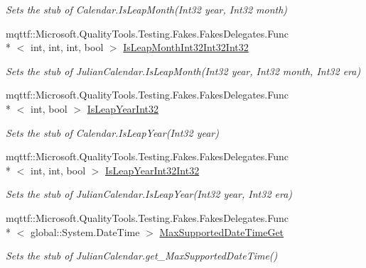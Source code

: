\begin{DoxyCompactItemize}
\begin{DoxyCompactList}\small\item\em Sets the stub of Calendar.\-Is\-Leap\-Month(\-Int32 year, Int32 month)\end{DoxyCompactList}\item 
mqttf\-::\-Microsoft.\-Quality\-Tools.\-Testing.\-Fakes.\-Fakes\-Delegates.\-Func\\*
$<$ int, int, int, bool $>$ \hyperlink{class_system_1_1_globalization_1_1_fakes_1_1_stub_julian_calendar_a53b5cff1d67f7c67dfa61dc92933f5c5}{Is\-Leap\-Month\-Int32\-Int32\-Int32}
\begin{DoxyCompactList}\small\item\em Sets the stub of Julian\-Calendar.\-Is\-Leap\-Month(\-Int32 year, Int32 month, Int32 era)\end{DoxyCompactList}\item 
mqttf\-::\-Microsoft.\-Quality\-Tools.\-Testing.\-Fakes.\-Fakes\-Delegates.\-Func\\*
$<$ int, bool $>$ \hyperlink{class_system_1_1_globalization_1_1_fakes_1_1_stub_julian_calendar_aa4a7c03d11867f3ac87b22980c0629db}{Is\-Leap\-Year\-Int32}
\begin{DoxyCompactList}\small\item\em Sets the stub of Calendar.\-Is\-Leap\-Year(\-Int32 year)\end{DoxyCompactList}\item 
mqttf\-::\-Microsoft.\-Quality\-Tools.\-Testing.\-Fakes.\-Fakes\-Delegates.\-Func\\*
$<$ int, int, bool $>$ \hyperlink{class_system_1_1_globalization_1_1_fakes_1_1_stub_julian_calendar_af8ee7fb759f2f8878aaeac3692b96f6e}{Is\-Leap\-Year\-Int32\-Int32}
\begin{DoxyCompactList}\small\item\em Sets the stub of Julian\-Calendar.\-Is\-Leap\-Year(\-Int32 year, Int32 era)\end{DoxyCompactList}\item 
mqttf\-::\-Microsoft.\-Quality\-Tools.\-Testing.\-Fakes.\-Fakes\-Delegates.\-Func\\*
$<$ global\-::\-System.\-Date\-Time $>$ \hyperlink{class_system_1_1_globalization_1_1_fakes_1_1_stub_julian_calendar_a2d5a8b651cc3ff7db26f630b58bb35b9}{Max\-Supported\-Date\-Time\-Get}
\begin{DoxyCompactList}\small\item\em Sets the stub of Julian\-Calendar.\-get\-\_\-\-Max\-Supported\-Date\-Time()\end{DoxyCompactList}\item 

\end{DoxyCompactItemize}
